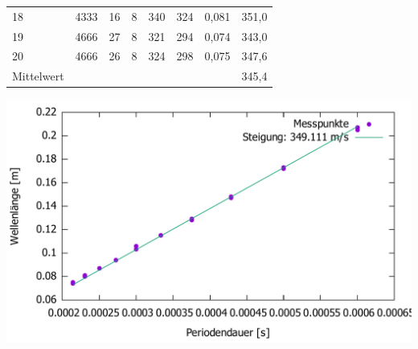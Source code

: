 \documentclass{scrartcl}
\begin{document}
\begin{table}[h!]
\begin{tabular}{l|l|l|l|l|l|l|l}
18      & 4333       & 16                & 8 & 340               & 324 & 0,081 & 351,0 \\
19      & 4666       & 27                & 8 & 321               & 294 & 0,074 & 343,0 \\
20      & 4666       & 26                & 8 & 324               & 298 & 0,075 & 347,6 \\
\hline
Mittelwert & & & & & & & 345,4
\end{tabular}
\includegraphics[width=1\textwidth]{linregV1_L.pdf}
\end{table}

\newpage
\end{document}
